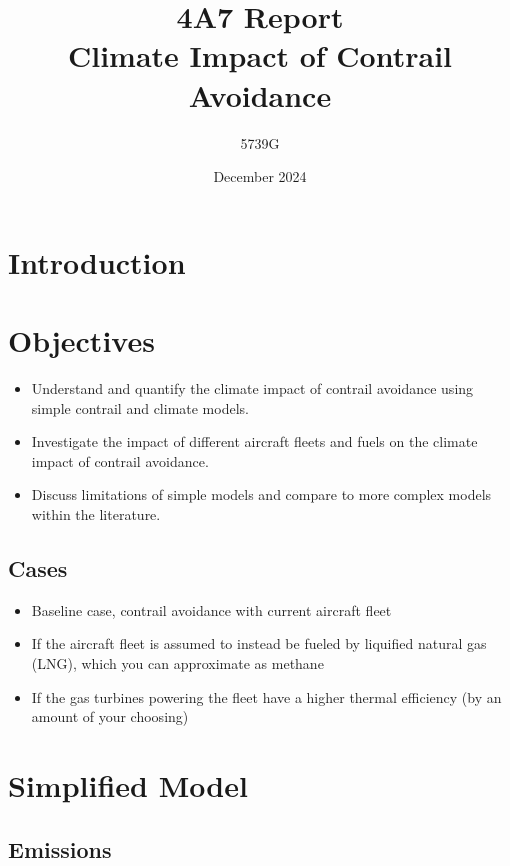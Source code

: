 \documentclass{article}
\begin{document}
\title{4A7 Report \\ Climate Impact of Contrail Avoidance}
\author{5739G}
\date{December 2024}
\maketitle

\section{Introduction}

\section{Objectives}

\begin{itemize}
    \item Understand and quantify the climate impact of contrail avoidance using simple contrail and climate models.
    \item Investigate the impact of different aircraft fleets and fuels on the climate impact of contrail avoidance.
    \item Discuss limitations of simple models and compare to more complex models within the literature.
\end{itemize}

\subsection{Cases}

\begin{itemize}
    \item Baseline case, contrail avoidance with current aircraft fleet
    \item If the aircraft fleet is assumed to instead be fueled by liquified natural gas (LNG), which you can approximate as methane
    \item If the gas turbines powering the fleet have a higher thermal efficiency (by an amount of your choosing) 
\end{itemize}

\section{Simplified Model}

\subsection{Emissions}
\end{document}
